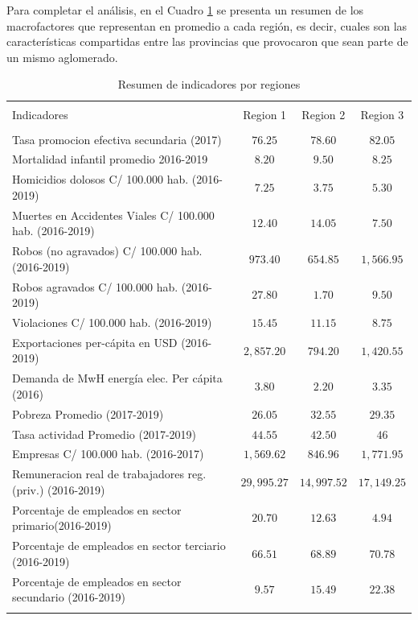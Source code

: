 \documentclass[12pt,a4paper]{article}
\begin{document}
Para completar el análisis, en el Cuadro \ref{cuadro:indicadores} se presenta un resumen de los macrofactores que representan en promedio a cada región, es decir, cuales son las características compartidas entre las provincias que provocaron que sean parte de un mismo aglomerado.
\begin{table}[!htbp] 
\center
\footnotesize
\raggedleft
  \caption{Resumen de indicadores por regiones} 
  \label{cuadro:indicadores} 
\begin{tabular}{@{\extracolsep{5pt}} lccc} 
\\[-1.8ex]\hline 
\hline \\[-1.8ex] 
 Indicadores & Region 1 & Region 2 & Region 3 \\ 
\hline \\[-1.8ex] 
 Tasa promocion efectiva secundaria (2017) & $76.25$ & $78.60$ & $82.05$ \\ 
 Mortalidad infantil promedio 2016-2019 & $8.20$ & $9.50$ & $8.25$ \\ 
 Homicidios dolosos C/ 100.000 hab. (2016-2019) & $7.25$ & $3.75$ & $5.30$ \\ 
 Muertes en Accidentes Viales C/ 100.000  hab.  (2016-2019) & $12.40$ & $14.05$ & $7.50$ \\ 
 Robos (no agravados) C/ 100.000 hab. (2016-2019) & $973.40$ & $654.85$ & $1,566.95$ \\ 
 Robos agravados C/ 100.000 hab. (2016-2019) & $27.80$ & $1.70$ & $9.50$ \\ 
 Violaciones  C/ 100.000 hab. (2016-2019) & $15.45$ & $11.15$ & $8.75$ \\ 
 Exportaciones per-cápita en USD (2016-2019) & $2,857.20$ & $794.20$ & $1,420.55$ \\ 
 Demanda de MwH energía elec. Per cápita (2016) & $3.80$ & $2.20$ & $3.35$ \\ 
 Pobreza Promedio (2017-2019) & $26.05$ & $32.55$ & $29.35$ \\ 
 Tasa actividad Promedio (2017-2019) & $44.55$ & $42.50$ & $46$ \\ 
 Empresas  C/ 100.000 hab. (2016-2017) & $1,569.62$ & $846.96$ & $1,771.95$ \\ 
 Remuneracion  real de trabajadores reg. (priv.) (2016-2019) & $29,995.27$ & $14,997.52$ & $17,149.25$ \\ 
 Porcentaje de empleados en sector primario(2016-2019) & $20.70$ & $12.63$ & $4.94$ \\ 
 Porcentaje de empleados en sector terciario (2016-2019) & $66.51$ & $68.89$ & $70.78$ \\ 
 Porcentaje de empleados en sector secundario (2016-2019) & $9.57$ & $15.49$ & $22.38$ 
\\ 
\hline \\[-1.8ex] 

\end{tabular} 
\end{table} 
\end{document}
